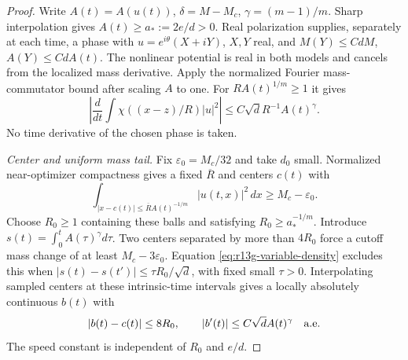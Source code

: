 \begin{proof}
Write $A(t)=A(u(t))$, $\delta=M-M_c$, $\gamma=(m-1)/m$.
Sharp interpolation gives $A(t)\ge a_*:=2e/d>0$.
Real polarization supplies, separately at each time, a phase with
$u=e^{i\theta}(X+iY)$, $X,Y$ real, and
$M(Y)\le CdM$, $A(Y)\le CdA(t)$.
The nonlinear potential is real in both models and cancels from the
localized mass derivative. Apply the normalized Fourier mass-commutator
bound after scaling $A$ to one. For $R A(t)^{1/m}\ge1$ it gives
\begin{equation}\label{eq:r13g-variable-density}
 \left|\frac d{dt}\int\chi((x-z)/R)|u|^2\right|
 \le C\sqrt d R^{-1}A(t)^\gamma.
\end{equation}
No time derivative of the chosen phase is taken.

\medskip\noindent\emph{Center and uniform mass tail.}
Fix $\varepsilon_0=M_c/32$ and take $d_0$ small. Normalized
near-optimizer compactness gives a fixed $\overline R$ and centers
$c(t)$ with
\[
 \int_{|x-c(t)|\le\overline R A(t)^{-1/m}}|u(t,x)|^2\,dx
 \ge M_c-\varepsilon_0.
\]
Choose $R_0\ge1$ containing these balls and satisfying
$R_0\ge a_*^{-1/m}$. Introduce $s(t)=\int_0^tA(\tau)^\gamma d\tau$.
Two centers separated by more than $4R_0$ force a cutoff mass change
of at least $M_c-3\varepsilon_0$. Equation
\eqref{eq:r13g-variable-density} excludes this when
$|s(t)-s(t')|\le\tau R_0/\sqrt d$, with fixed small $\tau>0$.
Interpolating sampled centers at these intrinsic-time intervals gives
a locally absolutely continuous $b(t)$ with
\begin{equation}\label{eq:r13g-variable-center}
 |b(t)-c(t)|\le8R_0,\qquad
 |b'(t)|\le C\sqrt d A(t)^\gamma\quad\hbox{a.e.}
\end{equation}
The speed constant is independent of $R_0$ and $e/d$.


\end{proof}
